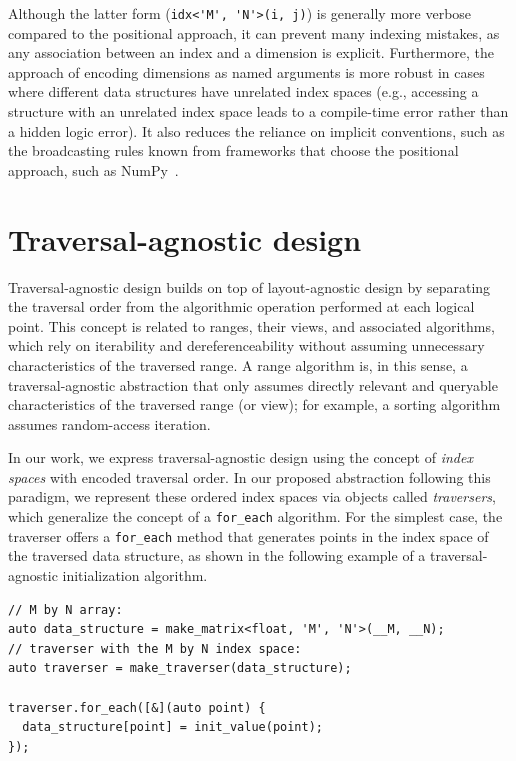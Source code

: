 Although the latter form (\lstinline{idx<'M', 'N'>(i, j)}) is generally more verbose compared to the positional approach, it can prevent many indexing mistakes, as any association between an index and a dimension is explicit. Furthermore, the approach of encoding dimensions as named arguments is more robust in cases where different data structures have unrelated index spaces (e.g., accessing a structure with an unrelated index space leads to a compile-time error rather than a hidden logic error). It also reduces the reliance on implicit conventions, such as the broadcasting rules known from frameworks that choose the positional approach, such as NumPy~\cite{harris2020array}.

\section{Traversal-agnostic design}\label{sec:traversal-agnostic-design}

Traversal-agnostic design builds on top of layout-agnostic design by separating the traversal order from the algorithmic operation performed at each logical point. This concept is related to \cpp ranges, their views, and associated algorithms, which rely on iterability and dereferenceability without assuming unnecessary characteristics of the traversed range. A range algorithm is, in this sense, a traversal-agnostic abstraction that only assumes directly relevant and queryable characteristics of the traversed range (or view); for example, a sorting algorithm assumes random-access iteration.

In our work, we express traversal-agnostic design using the concept of \emph{index spaces} with encoded traversal order. In our proposed abstraction following this paradigm, we represent these ordered index spaces via objects called \emph{traversers}, which generalize the concept of a \texttt{for\_each} algorithm. For the simplest case, the traverser offers a \lstinline{for_each} method that generates points in the index space of the traversed data structure, as shown in the following example of a traversal-agnostic initialization algorithm.

\begin{lstlisting}[style=C++, caption={A traversal-agnostic initialization algorithm}, label={lst:traversal-agnostic-initialization}]
// M by N array:
auto data_structure = make_matrix<float, 'M', 'N'>(__M, __N);
// traverser with the M by N index space:
auto traverser = make_traverser(data_structure);

traverser.for_each([&](auto point) {
  data_structure[point] = init_value(point);
});
\end{lstlisting}

